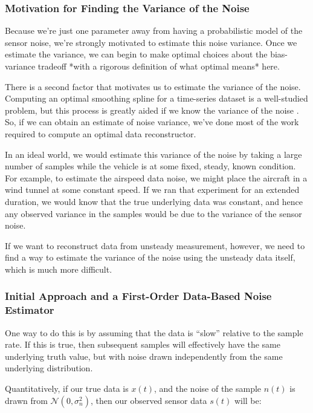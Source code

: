 \documentclass[conf]{new-aiaa}
\begin{document}
    \subsubsection{Motivation for Finding the Variance of the Noise}

    Because we're just one parameter away from having a probabilistic model of the sensor noise, we're strongly motivated to estimate this noise variance. Once we estimate the variance, we can begin to make optimal choices about the bias-variance tradeoff *with a rigorous definition of what optimal means* here.

    There is a second factor that motivates us to estimate the variance of the noise. Computing an optimal smoothing spline for a time-series dataset is a well-studied problem, but this process is greatly aided if we know the variance of the noise \cite{wahba}. So, if we can obtain an estimate of noise variance, we've done most of the work required to compute an optimal data reconstructor.

    In an ideal world, we would estimate this variance of the noise by taking a large number of samples while the vehicle is at some fixed, steady, known condition. For example, to estimate the airspeed data noise, we might place the aircraft in a wind tunnel at some constant speed. If we ran that experiment for an extended duration, we would know that the true underlying data was constant, and hence any observed variance in the samples would be due to the variance of the sensor noise.

    If we want to reconstruct data from unsteady measurement, however, we need to find a way to estimate the variance of the noise using the unsteady data itself, which is much more difficult.

    \subsubsection{Initial Approach and a First-Order Data-Based Noise Estimator}

    One way to do this is by assuming that the data is ``slow'' relative to the sample rate. If this is true, then subsequent samples will effectively have the same underlying truth value, but with noise drawn independently from the same underlying distribution.

    Quantitatively, if our true data is $x(t)$, and the noise of the sample $n(t)$ is drawn from $\mathcal{N}(0, \sigma^2_n)$, then our observed sensor data $s(t)$ will be:
\end{document}
